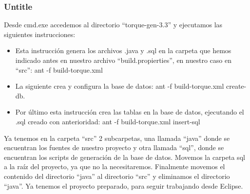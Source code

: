 \documentclass[24pt, a4paper, oneside, spanish]{beamer}
\begin{document}
\begin{frame}[allowframebreaks]
	\frametitle{Untitle} %

Desde cmd.exe accedemos al directorio “torque-gen-3.3” y ejecutamos las siguientes instrucciones: 
	\begin{itemize}
		\item Esta instrucción genera los archivos .java y .sql en la carpeta que hemos indicado antes en nuestro archivo “build.propierties”, en nuestro caso en “src”: ant -f build-torque.xml 
		\item La siguiente crea y configura la base de datos:  ant -f build-torque.xml create-db.
		\item Por último esta instrucción crea las tablas en la base de datos, ejecutando el .sql creado con anterioridad: ant -f build-torque.xml insert-sql
	\end{itemize}

Ya tenemos en la carpeta “src” 2 subcarpetas, una llamada “java” donde se encuentran los fuentes de nuestro proyecto y otra llamada “sql”, donde se encuentran los scripts de generación de la base de datos. Movemos la carpeta sql a la raíz del proyecto, ya que no la necesitaremos. Finalmente movemos el contenido del directorio “java” al directorio “src” y eliminamos el directorio “java”. Ya tenemos el proyecto preparado, para seguir trabajando desde Eclipse.

\end{frame}
\end{document}
